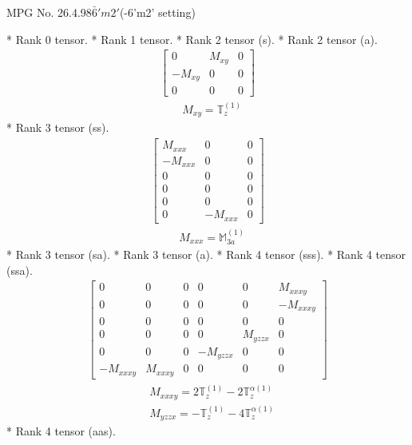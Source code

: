 \documentclass[fleqn,8pt,landscape]{jsarticle}
\begin{document}
\setcounter{MaxMatrixCols}{32}

\renewcommand{\tablename}{Table~}
\renewcommand{\figurename}{Figure~}
\begin{center}
\LARGE
MPG No. 26.4.98\quad$\bar{6}'m2'$\quad(-6'm2' setting)
\end{center}
* Rank 0 tensor.
* Rank 1 tensor.
* Rank 2 tensor (s).
* Rank 2 tensor (a).
\begin{align*}
\begin{bmatrix} 0 & M_{xy} & 0 \\ - M_{xy} & 0 & 0 \\ 0 & 0 & 0 \end{bmatrix}
\end{align*}
\begin{align*}
& M_{xy} = \mathbb{T}_{z}^{(1)}
\end{align*}
* Rank 3 tensor (ss).
\begin{align*}
\begin{bmatrix} M_{xxx} & 0 & 0 \\ - M_{xxx} & 0 & 0 \\ 0 & 0 & 0 \\ 0 & 0 & 0 \\ 0 & 0 & 0 \\ 0 & - M_{xxx} & 0 \end{bmatrix}
\end{align*}
\begin{align*}
& M_{xxx} = \mathbb{M}_{3a}^{(1)}
\end{align*}
* Rank 3 tensor (sa).
* Rank 3 tensor (a).
* Rank 4 tensor (sss).
* Rank 4 tensor (ssa).
\begin{align*}
\begin{bmatrix} 0 & 0 & 0 & 0 & 0 & M_{xxxy} \\ 0 & 0 & 0 & 0 & 0 & - M_{xxxy} \\ 0 & 0 & 0 & 0 & 0 & 0 \\ 0 & 0 & 0 & 0 & M_{yzzx} & 0 \\ 0 & 0 & 0 & - M_{yzzx} & 0 & 0 \\ - M_{xxxy} & M_{xxxy} & 0 & 0 & 0 & 0 \end{bmatrix}
\end{align*}
\begin{align*}
& M_{xxxy} = 2 \mathbb{T}_{z}^{(1)} - 2 \mathbb{T}_{z}^{\alpha(1)} \\
& M_{yzzx} = - \mathbb{T}_{z}^{(1)} - 4 \mathbb{T}_{z}^{\alpha(1)}
\end{align*}
* Rank 4 tensor (aas).
\end{document}

